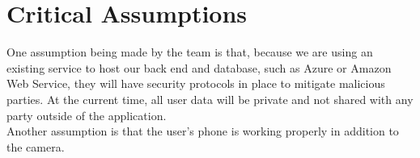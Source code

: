 \documentclass{article}
\begin{document}
\section{Critical Assumptions}

One assumption being made by the team is that, because we are using an existing service to host our back end and database, such as Azure or Amazon Web Service, they will have security protocols in place to mitigate malicious parties. At the current time, all user data will be private and not shared with any party outside of the application.\\

\noindent Another assumption is that the user's phone is working properly in addition to the camera.

\newpage
\begin{landscape}

\end{landscape}
\end{document}
